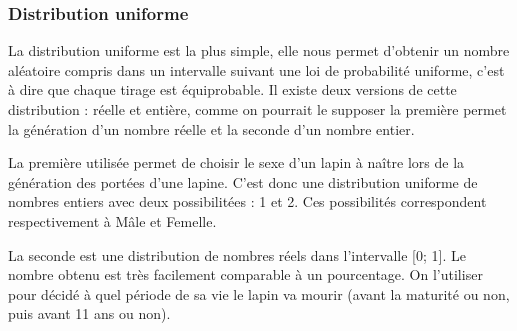 \documentclass[11pt,a4paper]{article}
\begin{document}
        \subsubsection{Distribution uniforme}
            La distribution uniforme est la plus simple, elle nous permet d'obtenir un nombre aléatoire
            compris dans un intervalle suivant une loi de probabilité uniforme, c'est à dire que chaque tirage est équiprobable.
            Il existe deux versions de cette distribution : réelle et entière, comme on pourrait le supposer la première permet la génération d'un nombre réelle et la seconde d'un nombre entier.
            \par
            La première utilisée permet de choisir le sexe d'un lapin à naître lors de la génération des portées d'une lapine.
            C'est donc une distribution uniforme de nombres entiers avec deux possibilitées : 1 et 2.
            Ces possibilités correspondent respectivement à Mâle et Femelle.
            \begin{mdframed}[backgroundcolor=light-gray, roundcorner=20pt, innerleftmargin=20, innertopmargin=1, innerbottommargin=1, outerlinewidth=1, linecolor=darkgray]
                
            \end{mdframed}
            \begin{mdframed}[backgroundcolor=light-gray, roundcorner=20pt, innerleftmargin=20, innertopmargin=1, innerbottommargin=1, outerlinewidth=1, linecolor=darkgray]
                
            \end{mdframed}
            \par
            La seconde est une distribution de nombres réels dans l'intervalle [0; 1]. Le nombre obtenu est très facilement comparable à un pourcentage.
            On l'utiliser pour décidé à quel période de sa vie le lapin va mourir (avant la maturité ou non, puis avant 11 ans ou non).
            \begin{mdframed}[backgroundcolor=light-gray, roundcorner=20pt, innerleftmargin=20, innertopmargin=1, innerbottommargin=1, outerlinewidth=1, linecolor=darkgray]
                
            \end{mdframed}
\end{document}
